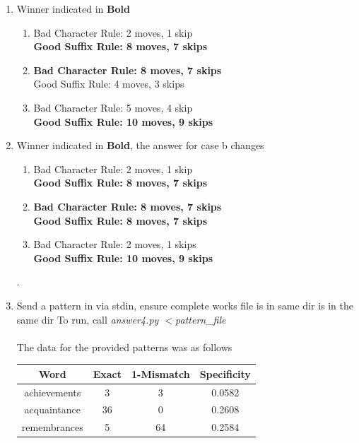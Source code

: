 \documentclass[12pt]{article}
\begin{document}
\begin{enumerate}
\begin{enumerate}[label=(\alph*)]
    \end{enumerate}
    \item Winner indicated in \textbf{Bold}
    \begin{enumerate}[label=(\alph*)]
        \item
        Bad Character Rule: 2 moves, 1 skip
         \\ \textbf{Good Suffix Rule: 8 moves, 7 skips}
        \item
        \textbf{Bad Character Rule: 8 moves, 7 skips}
        \\ Good Suffix Rule: 4 moves, 3 skips
        \item
        Bad Character Rule: 5 moves, 4 skip
        \\ \textbf{Good Suffix Rule: 10 moves, 9 skips}
    \end{enumerate}
    \item Winner indicated in \textbf{Bold}, the answer for case b changes
    \begin{enumerate}[label=(\alph*)]
        \item
        Bad Character Rule: 2 moves, 1 skip
         \\ \textbf{Good Suffix Rule: 8 moves, 7 skips}
        \item
        \textbf{Bad Character Rule: 8 moves, 7 skips}
        \\ \textbf{Good Suffix Rule: 8 moves, 7 skips}
        \item
        Bad Character Rule: 2 moves, 1 skips
        \\ \textbf{Good Suffix Rule: 10 moves, 9 skips}
    \end{enumerate}.
    \item Send a pattern in via stdin, ensure complete works file is in same dir is in the same dir To run, call
    \textit{answer4.py $<$pattern\_file} \\ \\
    The data for the provided patterns was as follows \\
    \begin{flushleft}
        \begin{tabular}{ |c|c|c|c| }
        \hline
        \textbf{Word} & \textbf{Exact} & \textbf{1-Mismatch} & \textbf{Specificity} \\
        \hline
        achievements & 3 & 3 & 0.0582 \\
        acquaintance & 36 & 0 & 0.2608 \\
        remembrances & 5 & 64 & 0.2584 \\

\end{tabular}
\end{flushleft}
\end{enumerate}
\end{document}
